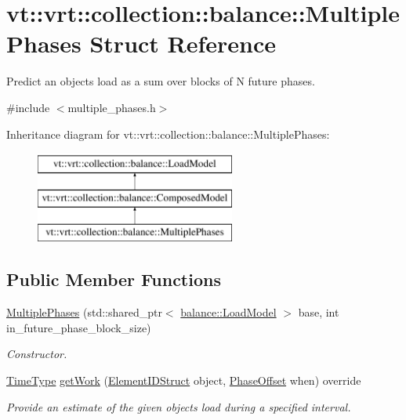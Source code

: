 \hypertarget{structvt_1_1vrt_1_1collection_1_1balance_1_1_multiple_phases}{}\section{vt\+:\+:vrt\+:\+:collection\+:\+:balance\+:\+:Multiple\+Phases Struct Reference}
\label{structvt_1_1vrt_1_1collection_1_1balance_1_1_multiple_phases}


Predict an object\textquotesingle{}s load as a sum over blocks of N future phases.  




{\ttfamily \#include $<$multiple\+\_\+phases.\+h$>$}

Inheritance diagram for vt\+:\+:vrt\+:\+:collection\+:\+:balance\+:\+:Multiple\+Phases\+:\begin{figure}[H]
\begin{center}
\leavevmode
\includegraphics[height=3.000000cm]{structvt_1_1vrt_1_1collection_1_1balance_1_1_multiple_phases}
\end{center}
\end{figure}
\subsection*{Public Member Functions}
\begin{DoxyCompactItemize}
\item 
\hyperlink{structvt_1_1vrt_1_1collection_1_1balance_1_1_multiple_phases_a28aba5fe005d35319e34ca8406aca936}{Multiple\+Phases} (std\+::shared\+\_\+ptr$<$ \hyperlink{structvt_1_1vrt_1_1collection_1_1balance_1_1_load_model}{balance\+::\+Load\+Model} $>$ base, int in\+\_\+future\+\_\+phase\+\_\+block\+\_\+size)
\begin{DoxyCompactList}\small\item\em Constructor. \end{DoxyCompactList}\item 
\hyperlink{namespacevt_a876a9d0cd5a952859c72de8a46881442}{Time\+Type} \hyperlink{structvt_1_1vrt_1_1collection_1_1balance_1_1_multiple_phases_aebe7b174623cffe8f4790e32e15859ff}{get\+Work} (\hyperlink{structvt_1_1vrt_1_1collection_1_1balance_1_1_element_i_d_struct}{Element\+I\+D\+Struct} object, \hyperlink{structvt_1_1vrt_1_1collection_1_1balance_1_1_phase_offset}{Phase\+Offset} when) override
\begin{DoxyCompactList}\small\item\em Provide an estimate of the given object\textquotesingle{}s load during a specified interval. \end{DoxyCompactList}\end{DoxyCompactItemize}
